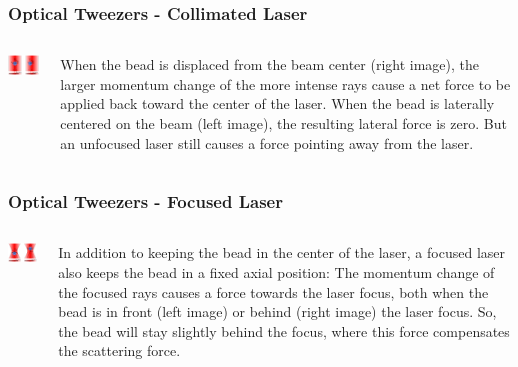 \documentclass{beamer}
\begin{document}
\begin{frame}\frametitle{Optical Tweezers -  Collimated Laser}
\begin{columns}
\begin{column}{5cm}
\begin{center}
\includegraphics[width=4cm]{fig/otg1.png}
\end{center}
\end{column}
\begin{column}{6cm}
When the bead is displaced from the beam center (right image), the larger momentum change of the more intense rays cause a net force to be applied back toward the center of the laser. When the bead is laterally centered on the beam (left image), the resulting lateral force is zero. But an unfocused laser still causes a force pointing away from the laser.
\end{column}
\end{columns}
\end{frame}

\begin{frame}\frametitle{Optical Tweezers - Focused Laser}
\begin{columns}
\begin{column}{5cm}
\begin{center}
\includegraphics[width=4cm]{fig/otg2.png}
\end{center}
\end{column}
\begin{column}{6cm}
In addition to keeping the bead in the center of the laser, a focused laser also keeps the bead in a fixed axial position: The momentum change of the focused rays causes a force towards the laser focus, both when the bead is in front (left image) or behind (right image) the laser focus. So, the bead will stay slightly behind the focus, where this force compensates the scattering force.
\end{column}
\end{columns}
\end{frame}
\end{document}
